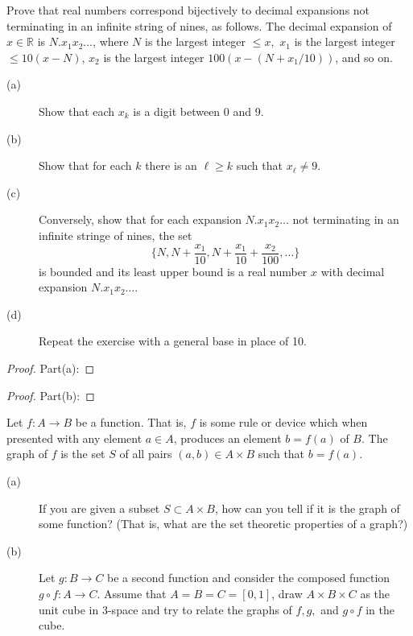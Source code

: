 \documentclass[11pt]{article}
\begin{document}

\begin{exercise}
    Prove that real numbers correspond bijectively to decimal expansions not terminating in an infinite string of nines, as follows. The decimal expansion of $x \in \mathbb{R}$ is $N.x_1x_2\ldots$, where $N$ is the largest integer $\leq x,$ $x_1$ is the largest integer $\leq 10(x-N)$, $x_2$ is the largest integer $100(x-(N+x_1/10))$, and so on. 
    \begin{description}
        \item[(a)] Show that each $x_k$ is a digit between 0 and 9. 
        \item[(b)] Show that for each $k$ there is an $\ell \geq k$ such that $x_\ell \neq 9$.
        \item[(c)] Conversely, show that for each expansion $N.x_1x_2\ldots$ not terminating in an infinite stringe of nines, the set 
        \[
        \{N, N+ \frac{x_1}{10}, N+ \frac{x_1}{10} + \frac{x_2}{100}, \ldots\}
        \] 
        is bounded and its least upper bound is a real number $x$ with decimal expansion $N.x_1x_2\ldots$.
        \item[(d)] Repeat the exercise with a general base in place of 10. 
    \end{description}
\end{exercise}

\begin{solution}
    \begin{proof}
        Part(a): 
    \end{proof}
    \begin{proof}
        Part(b): 
    \end{proof}
\end{solution}


\begin{exercise}
    Let $f: A \rightarrow B$ be a function. That is, $f$ is some rule or device which when presented with any element $a \in A$, produces an element $b = f(a)$ of $B$. The graph of $f$ is the set $S$ of all pairs $(a,b) \in A \times B$ such that $b= f(a)$.

    \begin{description}
        \item[(a)] If you are given a subset $S \subset A \times B$, how can you tell if it is the graph of some function? (That is, what are the set theoretic properties of a graph?)
        \item[(b)] Let $g : B \rightarrow C$ be a second function and consider the composed function $g \circ f : A \rightarrow C$. Assume that $A=B=C=[0,1]$, draw $A \times B \times C$ as the unit cube in 3-space and try to relate the graphs of $f,g,$ and $g \circ f$ in the cube. 
    \end{description}

\end{exercise}
\end{document}

